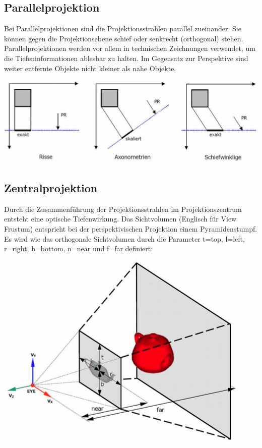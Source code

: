 \documentclass[10pt]{article}
\begin{document}
\subsection{Parallelprojektion}
Bei Parallelprojektionen sind die Projektionsstrahlen parallel zueinander. Sie können gegen die Projektionsebene schief oder senkrecht (orthogonal) stehen. Parallelprojektionen werden vor allem in technischen Zeichnungen verwendet, um die Tiefeninformationen ablesbar zu halten. Im Gegensatz zur Perspektive sind weiter entfernte Objekte nicht kleiner als nahe Objekte. 
\begin{center}
	\includegraphics[scale=0.4]{parallelprojektion.png}
\end{center}
\subsection{Zentralprojektion}
Durch die Zusammenführung der Projektionsstrahlen im Projektionszentrum entsteht eine optische Tiefenwirkung. Das Sichtvolumen (Englisch für View Frustum) entspricht bei der perspektivischen Projektion einem Pyramidenstumpf. Es wird wie das orthogonale Sichtvolumen durch die Parameter t=top, l=left, r=right, b=bottom, n=near und f=far definiert:
\begin{center}
	\includegraphics[scale=0.4]{zentralprojektion.png}
\end{center}
\end{document}
